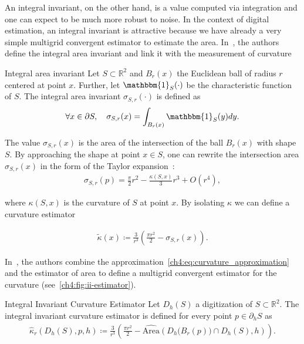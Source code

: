 An integral invariant, on the other hand, is a value computed via integration and one can expect to be much more robust to noise. In the context of digital estimation, an integral invariant is attractive because we have already a very simple multigrid convergent estimator to estimate the area. In~\cite{manay04intinvariant}, the authors define the integral area invariant and link it with the measurement of curvature

\begin{definition}{Integral area invariant}
  Let $S \subset \mathbb{R}^2$ and $B_r(x)$ the Euclidean ball of radius $r$ centered at point $x$. Further, let  $\mathbbm{1}_S(\cdot)$ be the characteristic function of $S$. The integral area invariant $\sigma_{S,r}(\cdot)$ is
  defined as
  \begin{align*}
    \forall x \in \partial S, \quad \sigma_{S,r}(x) = \int_{B_r(x)}{ \mathbbm{1}_S(y) dy}.
  \end{align*}
\end{definition}


The value $\sigma_{S,r}(x)$ is the area of the intersection of the ball $B_r(x)$ with shape $S$. By approaching the shape at point $x \in S$, one can rewrite the intersection area $\sigma_{S,r}(x)$ in the form of the Taylor expansion~\cite{pottman09intinvariant}:
\begin{align*}
  \sigma_{S,r}(p) = \frac{\pi}{2}r^2 - \frac{\kappa(S,x)}{3}r^3 + O(r^4),
\end{align*}
		
where $\kappa(S,x)$ is the curvature of $S$ at point $x$. By isolating $\kappa$ we can define a curvature estimator
	
\begin{align}
  \tilde{\kappa}(x) \coloneqq \frac{3}{r^3}\left( \frac{\pi r^2}{2} - \sigma_{S,r}(x) \right).
  \label{ch4:eq:curvature_approximation}
\end{align}
	
In~\cite{coeurjolly13integral}, the authors combine the approximation~\cref{ch4:eq:curvature_approximation} and the estimator of area to define a multigrid convergent estimator for the curvature (see~\cref{ch4:fig:ii-estimator}).

\begin{definition}{Integral Invariant Curvature Estimator}
  Let $D_h(S)$ a digitization of $S \subset \mathbb{R}^2$. The integral invariant curvature estimator is defined for every point $p \in \partial_h S$ as
  \begin{align*}
    \hat{\kappa}_{r}(D_h(S),p,h) \coloneqq \frac{3}{r^3} \left( \frac{\pi r^2}{2} - \widehat{\text{Area}} \left( D_h\big( B_{r} ( p ) \big) \cap D_h(S), h \right) \right).
  \end{align*}
\end{definition}


